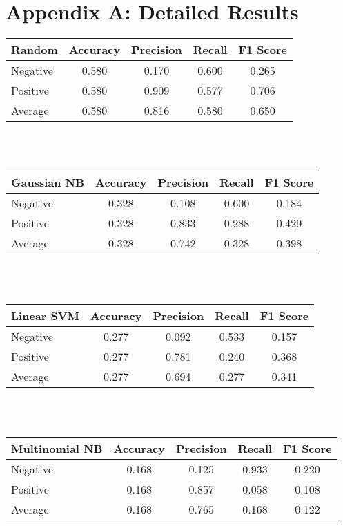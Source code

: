 \documentclass[letterpaper]{article}
\begin{document}
\section{Appendix A: Detailed Results}
{\small

\noindent\begin{tabular}{C{2cm} | c c c c}
\textbf{Random} & Accuracy  & Precision & Recall    & F1 Score  \\
\hline
Negative        & 0.580     & 0.170     & 0.600     & 0.265     \\
Positive        & 0.580     & 0.909     & 0.577     & 0.706     \\
Average         & 0.580     & 0.816     & 0.580     & 0.650     \\
\end{tabular} \\ \\



\noindent\begin{tabular}{C{2cm} | c c c c}
\textbf{Gaussian NB}    & Accuracy  & Precision & Recall    & F1 Score  \\
\hline
Negative        & 0.328     & 0.108     & 0.600     & 0.184     \\
Positive        & 0.328     & 0.833     & 0.288     & 0.429     \\
Average         & 0.328     & 0.742     & 0.328     & 0.398     \\
\end{tabular} \\ \\



\noindent\begin{tabular}{C{2cm} | c c c c}
\textbf{Linear SVM} & Accuracy  & Precision & Recall    & F1 Score  \\
\hline
Negative        & 0.277     & 0.092     & 0.533     & 0.157     \\
Positive        & 0.277     & 0.781     & 0.240     & 0.368     \\
Average         & 0.277     & 0.694     & 0.277     & 0.341     \\
\end{tabular} \\ \\



\noindent\begin{tabular}{C{2cm} | c c c c}
\textbf{Multinomial NB}    & Accuracy  & Precision & Recall    & F1 Score  \\
\hline
Negative        & 0.168     & 0.125     & 0.933     & 0.220     \\
Positive        & 0.168     & 0.857     & 0.058     & 0.108     \\
Average         & 0.168     & 0.765     & 0.168     & 0.122     \\
\end{tabular} \\ \\



}
\end{document}
